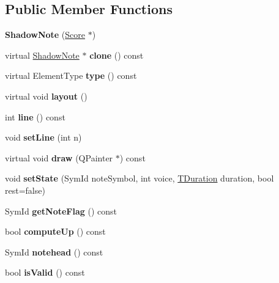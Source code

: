 \subsection*{Public Member Functions}
\begin{DoxyCompactItemize}
\item 
\mbox{\label{class_ms_1_1_shadow_note_a78b39b80e31328d7b131a57623426587}} 
{\bfseries Shadow\+Note} (\hyperlink{class_ms_1_1_score}{Score} $\ast$)
\item 
\mbox{\label{class_ms_1_1_shadow_note_a1831928fa373f1ca16baf90a92b48f0f}} 
virtual \hyperlink{class_ms_1_1_shadow_note}{Shadow\+Note} $\ast$ {\bfseries clone} () const
\item 
\mbox{\label{class_ms_1_1_shadow_note_a6a1513126afb1c62a56a2eda7255f39e}} 
virtual Element\+Type {\bfseries type} () const
\item 
\mbox{\label{class_ms_1_1_shadow_note_a9414a24b22af9605f0f253971aadfd90}} 
virtual void {\bfseries layout} ()
\item 
\mbox{\label{class_ms_1_1_shadow_note_a8c6b9312f37c08b1be2fc68d8991e74e}} 
int {\bfseries line} () const
\item 
\mbox{\label{class_ms_1_1_shadow_note_a4b30aa1903bc38506104687bb516d070}} 
void {\bfseries set\+Line} (int n)
\item 
\mbox{\label{class_ms_1_1_shadow_note_abecf2dc92e09378159173193deffe275}} 
virtual void {\bfseries draw} (Q\+Painter $\ast$) const
\item 
\mbox{\label{class_ms_1_1_shadow_note_ad27c0caa28320c458527cb874378bcde}} 
void {\bfseries set\+State} (Sym\+Id note\+Symbol, int voice, \hyperlink{class_ms_1_1_t_duration}{T\+Duration} duration, bool rest=false)
\item 
\mbox{\label{class_ms_1_1_shadow_note_ad4bd2a46df9945cbfc0762b5dd515a90}} 
Sym\+Id {\bfseries get\+Note\+Flag} () const
\item 
\mbox{\label{class_ms_1_1_shadow_note_adadc74a94e540ec3cb1efd74a15d1db6}} 
bool {\bfseries compute\+Up} () const
\item 
\mbox{\label{class_ms_1_1_shadow_note_a80e5b99aae4d1cb97b94c1fbaa968349}} 
Sym\+Id {\bfseries notehead} () const
\item 
\mbox{\label{class_ms_1_1_shadow_note_a81ccd17524d21c83548339c574c56628}} 
bool {\bfseries is\+Valid} () const
\end{DoxyCompactItemize}
